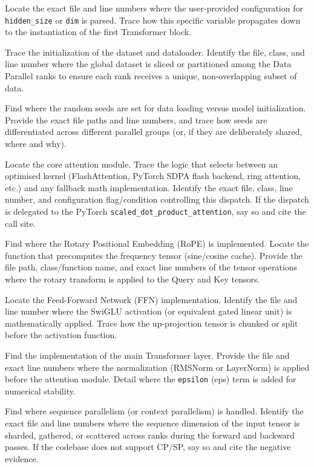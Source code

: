Locate the exact file and line numbers where the user-provided
configuration for \texttt{hidden\_size} or \texttt{dim} is parsed.
Trace how this specific variable propagates down to the instantiation
of the first Transformer block.

Trace the initialization of the dataset and dataloader. Identify the
file, class, and line number where the global dataset is sliced or
partitioned among the Data Parallel ranks to ensure each rank
receives a unique, non-overlapping subset of data.

Find where the random seeds are set for data loading versus model
initialization. Provide the exact file paths and line numbers, and
trace how seeds are differentiated across different parallel groups
(or, if they are deliberately shared, where and why).

Locate the core attention module. Trace the logic that selects
between an optimised kernel (FlashAttention, PyTorch SDPA flash
backend, ring attention, etc.) and any fallback math implementation.
Identify the exact file, class, line number, and configuration
flag/condition controlling this dispatch. If the dispatch is
delegated to the PyTorch \texttt{scaled\_dot\_product\_attention}, say
so and cite the call site.

Find where the Rotary Positional Embedding (RoPE) is implemented.
Locate the function that precomputes the frequency tensor
(sine/cosine cache). Provide the file path, class/function name, and
exact line numbers of the tensor operations where the rotary
transform is applied to the Query and Key tensors.

Locate the Feed-Forward Network (FFN) implementation. Identify the
file and line number where the SwiGLU activation (or equivalent gated
linear unit) is mathematically applied. Trace how the up-projection
tensor is chunked or split before the activation function.

Find the implementation of the main Transformer layer. Provide the
file and exact line numbers where the normalization (RMSNorm or
LayerNorm) is applied before the attention module. Detail where the
\texttt{epsilon} (eps) term is added for numerical stability.

Find where sequence parallelism (or context parallelism) is handled.
Identify the exact file and line numbers where the sequence dimension
of the input tensor is sharded, gathered, or scattered across ranks
during the forward and backward passes. If the codebase does not
support CP/SP, say so and cite the negative evidence.

